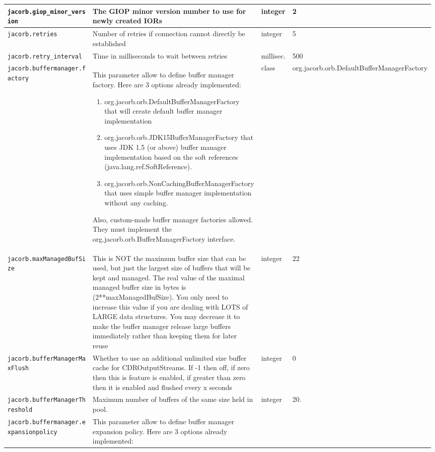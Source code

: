 \begin{small}
\begin{longtable}{|p{5cm}|p{7.5cm}|p{1.5cm}|p{1.5cm}|}
\verb"jacorb.giop_minor_vers"
\verb"ion" & The GIOP minor version number to use for newly created
IORs & integer & 2 \\
\hline
\verb"jacorb.retries" & Number of retries if connection cannot
directly be established & integer & 5 \\
\hline
\verb"jacorb.retry_interval" & Time in milliseconds to wait between
retries & millisec. & 500 \\
\hline
\verb"jacorb.buffermanager.f"
\verb"actory" & This parameter allow to define buffer manager
factory. Here are 3 options already implemented:
\begin{enumerate}
\item org.jacorb.orb.DefaultBufferManagerFactory that will create
    default buffer manager implementation
\item org.jacorb.orb.JDK15BufferManagerFactory that uses JDK 1.5 (or
    above) buffer manager implementation based on the soft references
    (java.lang.ref.SoftReference).
\item org.jacorb.orb.NonCachingBufferManagerFactory that uses simple
    buffer manager implementation without any caching.
\end{enumerate}
Also, custom-made buffer manager factories allowed. They must implement
the org.jacorb.orb.BufferManagerFactory interface.
& class & \tiny{org.jacorb.\-orb.\-DefaultBufferManagerFactory} \\
\hline
\verb"jacorb.maxManagedBufSi"
\verb"ze" & This is NOT the maximum buffer size that can be used, but
just the largest size of buffers that will be kept and managed. The
real value of the maximal managed buffer size in bytes is
(2**maxManagedBufSize). You only need to increase this value if you
are dealing with LOTS of LARGE data structures. You
may decrease it to make the buffer manager release large buffers
immediately rather than keeping them for later reuse & integer & 22 \\
\hline
\verb"jacorb.bufferManagerMa"
\verb"xFlush" & Whether to use an additional unlimited size buffer
cache for CDROutputStreams. If -1 then off, if zero then this is
feature is enabled, if greater than zero then it is enabled and
flushed every x seconds & integer & 0 \\
\hline
\verb"jacorb.bufferManagerTh"
\verb"reshold" & Maximum number of buffers of the same size held
in pool. & integer & 20. \\
\hline
\verb"jacorb.buffermanager.e"
\verb"xpansionpolicy" & This parameter allow to define buffer manager
expansion policy. Here are 3 options already implemented:

\end{longtable}
\end{small}
